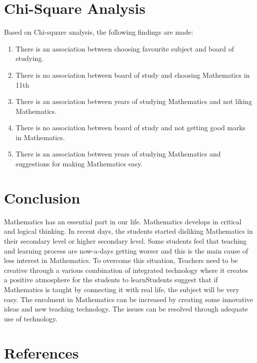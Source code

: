 \documentclass{article}
\begin{document}
\section{Chi-Square Analysis}
Based on Chi-square analysis, the following findings are made:
\begin{enumerate}
    \item There is an association between choosing favourite subject and board of studying.
    \item There is no association between board of study and choosing Mathematics in 11th
    \item There is an association between years of studying Mathematics and not liking Mathematics.
    \item There is no association between board of study and not getting good marks in Mathematics.
    \item There is an association between years of studying Mathematics and suggestions for making Mathematics easy.
\end{enumerate}

\section{Conclusion}
Mathematics has an essential part in our life. Mathematics develops in critical and logical thinking. In recent days, the students started disliking Mathematics in their secondary level or higher secondary level. Some students feel that teaching and learning process are now-a-days getting worser and this is the main cause of less interest in Mathematics. To overcome this situation, Teachers need to be creative through a various combination of integrated technology where it creates a positive atmosphere for the students to learnStudents suggest that if Mathematics is taught by connecting it with real life, the subject will be very easy. The enrolment in Mathematics can be increased by creating some innovative ideas and new teaching technology. The issues can be resolved through adequate use of technology.

\section{References}


\end{document}
